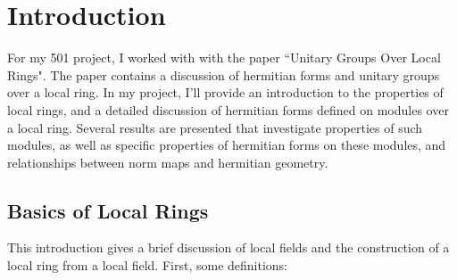 \section{Introduction}

For my 501 project, I worked with with the paper ``Unitary Groups Over Local Rings"\cite{cruickshank}.
The paper contains a discussion of hermitian forms and unitary groups over a local ring.
In my project, I'll provide an introduction to the properties of local rings, and a detailed discussion of hermitian forms
defined on modules over a local ring.
Several results are presented that investigate properties of such modules, as well as specific properties of hermitian forms on these modules,
and relationships between norm maps and hermitian geometry.

\subsection{Basics of Local Rings}

This introduction gives a brief discussion of local fields and the construction of a local ring from a local field.
First, some definitions:

